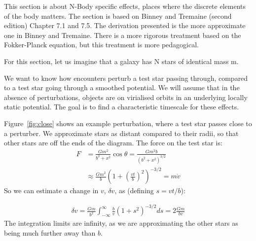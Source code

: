 \documentclass[12pt]{article}
\begin{document}
This section is about N-Body specific effects, places where the discrete elements of the body matters. The section is based on Binney and Tremaine (second edition) Chapter 7.1 and 7.5. The derivation presented is the more approximate one in Binney and Tremaine. There is a more rigorous treatment based on the Fokker-Planck equation, but this treatment is more pedagogical.

For this section, let us imagine that a galaxy has N stars of identical mass m.

We want to know how encounters perturb a test star passing through, compared to a test star going through a smoothed potential. We will assume that in the absence of perturbations, objects are on virialised orbits in an underlying locally static potential. The goal is to find a characteristic timescale for these effects.


Figure~\ref{fig:close} shows an example perturbation, where a test star passes close to a perturber. We approximate stars as distant compared to their radii, so that other stars are off the ends of the diagram. The force on the test star is:
\begin{align}
 F &= \frac{G m^2}{b^2 + x^2} \cos \theta = \frac{G m^2 b}{(b^2 + x^2)^{3/2}} \\
 &\approx \frac{Gm^2}{b} \left( 1 + \left(\frac{v t}{b}\right)^2\right)^{-3/2} = m \dot{v}
\end{align}
So we can estimate a change in $v$, $\delta v$, as (defining $s = v t / b$):

\begin{align}
\delta v = \frac{G m}{b^2} \int^\infty_{-\infty} \frac{b}{v} (1 + s^2)^{-3/2} ds = 2\frac{G m}{b v}
\end{align}
The integration limits are infinity, as we are approximating the other stars as being much further away than $b$.
\end{document}
